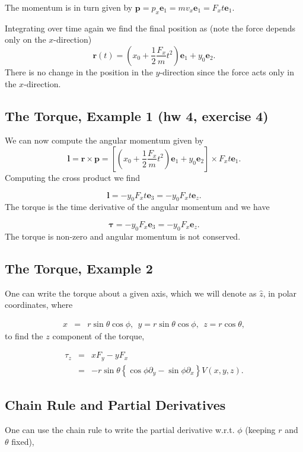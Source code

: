 \documentclass[%
oneside,                 %
final,                   %
10pt]{article}
\begin{document}
The momentum is in turn given by $\bm{p}=p_x\bm{e}_1=mv_x\bm{e}_1=F_xt\bm{e}_1$.

Integrating over time again we find the final position as (note the force depends only on the $x$-direction)
\[
\bm{r}(t)=(x_0+\frac{1}{2}\frac{F_x}{m}t^2) \bm{e}_1+y_0\bm{e}_2.
\]
There is no change in the position in the $y$-direction since the force acts only in the $x$-direction.

\subsection*{The Torque, Example 1 (hw 4, exercise 4)}

We can now compute the angular momentum given by
\[
\bm{l}=\bm{r}\times\bm{p}=\left[(x_0+\frac{1}{2}\frac{F_x}{m}t^2) \bm{e}_1+y_0\bm{e}_2\right]\times F_xt\bm{e}_1.
\]
Computing the cross product we find

\[
\bm{l}=-y_0F_xt\bm{e}_3=-y_0F_xt\bm{e}_z.
\]
The torque is the time derivative of the angular momentum and we have

\[
\bm{\tau}=-y_0F_x\bm{e}_3=-y_0F_x\bm{e}_z.
\]
The torque is non-zero and angular momentum is not conserved.

\subsection*{The Torque, Example 2}

One can write the torque about a given axis, which we will denote as $\hat{z}$, in polar coordinates, where

\begin{eqnarray}
x&=&r\sin\theta\cos\phi,~~y=r\sin\theta\cos\phi,~~z=r\cos\theta,
\end{eqnarray}
to find the $z$ component of the torque,

\begin{eqnarray}
\tau_z&=&xF_y-yF_x\\
\nonumber
&=&-r\sin\theta\left\{\cos\phi \partial_y-\sin\phi \partial_x\right\}V(x,y,z).
\end{eqnarray}

\subsection*{Chain Rule and Partial Derivatives}

One can use the chain rule to write the partial derivative w.r.t. $\phi$ (keeping $r$ and $\theta$ fixed),
\end{document}
